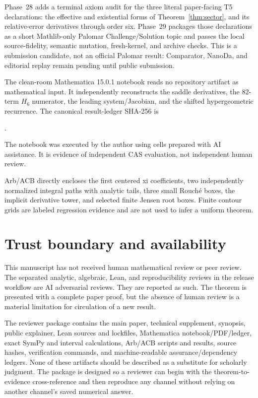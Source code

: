 \documentclass[12pt]{article}
\begin{document}
Phase~28 adds a terminal axiom audit for the three literal paper-facing T5
declarations: the effective and existential forms of
Theorem~\ref{thm:sector}, and its relative-error derivatives through order
six.  Phase~29 packages those declarations as a short Mathlib-only Palomar
Challenge/Solution topic and passes the local source-fidelity, semantic
mutation, fresh-kernel, and archive checks.  This is a submission candidate,
not an official Palomar result: Comparator, NanoDa, and editorial replay
remain pending until public submission.

The clean-room Mathematica 15.0.1 notebook reads no repository artifact as
mathematical input.  It independently reconstructs the saddle derivatives,
the $82$-term $H_6$ numerator, the leading system/Jacobian, and the shifted
hypergeometric recurrence.  The canonical result-ledger SHA-256 is
\begin{center}
.
\end{center}
The notebook was executed by the author using cells prepared with AI
assistance.  It is evidence of independent CAS evaluation, not independent
human review.

Arb/ACB directly encloses the first centered xi coefficients, two
independently normalized integral paths with analytic tails, three small
Rouch\'e boxes, the implicit derivative tower, and selected finite Jensen
root boxes.  Finite contour grids are labeled regression evidence and are
not used to infer a uniform theorem.

\section{Trust boundary and availability}\label{sec:trust}

This manuscript has not received human mathematical review or peer review.
The separated analytic, algebraic, Lean, and reproducibility reviews in the
release workflow are AI adversarial reviews.  They are reported as such.
The theorem is presented with a complete paper proof, but the absence of
human review is a material limitation for circulation of a new result.

The reviewer package contains the main paper, technical supplement, synopsis,
public explainer, Lean sources and lockfiles, Mathematica notebook/PDF/ledger,
exact SymPy and interval calculations, Arb/ACB scripts and results, source
hashes, verification commands, and machine-readable assurance/dependency
ledgers.  None of these artifacts should be described as a substitute for
scholarly judgment.  The package is designed so a reviewer can begin with
the theorem-to-evidence cross-reference and then reproduce any channel
without relying on another channel's saved numerical answer.
\end{document}
